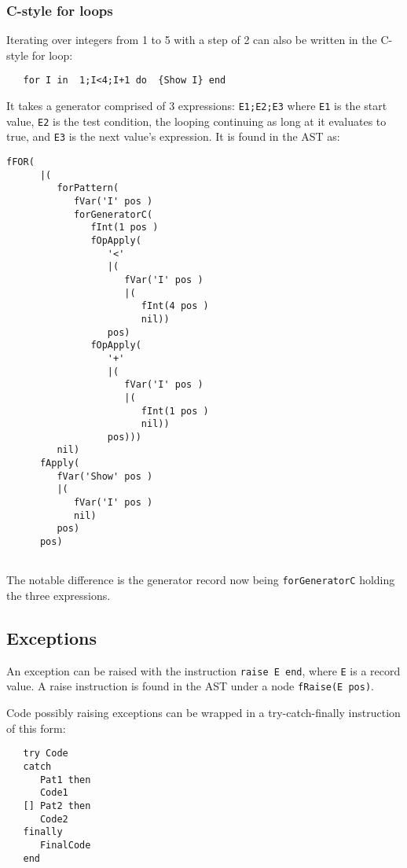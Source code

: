 \documentclass[a4paper]{memoir}
\begin{document}
\subsubsection{C-style for loops}
Iterating over integers from 1 to 5 with a step of 2 can also be written in the C-style for loop:
\begin{lstlisting}
   for I in  1;I<4;I+1 do  {Show I} end
\end{lstlisting}
It takes a generator comprised of 3 expressions: \lstinline!E1;E2;E3! where
\lstinline!E1! is the start value, \lstinline!E2! is the test condition, the
looping continuing as long at it evaluates to true, and \lstinline!E3! is the
next value's expression.
It is found in the AST as:
\begin{lstlisting}
fFOR(
      |(
         forPattern(
            fVar('I' pos )
            forGeneratorC(
               fInt(1 pos )
               fOpApply(
                  '<'
                  |(
                     fVar('I' pos )
                     |(
                        fInt(4 pos )
                        nil))
                  pos)
               fOpApply(
                  '+'
                  |(
                     fVar('I' pos )
                     |(
                        fInt(1 pos )
                        nil))
                  pos)))
         nil)
      fApply(
         fVar('Show' pos )
         |(
            fVar('I' pos )
            nil)
         pos)
      pos)
  
\end{lstlisting}

The notable difference is the generator record now being
\lstinline!forGeneratorC! holding the three expressions.

\subsection{Exceptions}\label{sec:input:exceptions}
An exception can be raised with the instruction \lstinline!raise E end!, where
\lstinline!E! is a record value. %
A raise instruction is found in the AST under a node \lstinline!fRaise(E pos)!.

Code possibly raising exceptions can be wrapped in a try-catch-finally
instruction of this form:
\begin{lstlisting}
   try Code
   catch
      Pat1 then
      Code1
   [] Pat2 then
      Code2
   finally
      FinalCode
   end
\end{lstlisting}
\end{document}
